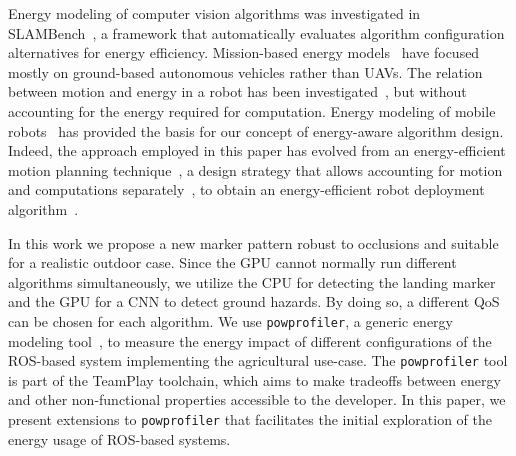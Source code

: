 \documentclass[conference]{IEEEtran}
\newcommand{\stt}[1]{{\small\tt #1}} %
\newcommand{\powprof}{\stt{powprofiler}}
\begin{document}
Energy modeling of computer vision algorithms was investigated in
SLAMBench~\cite{nardi2015introducing}, a framework that automatically evaluates
algorithm configuration alternatives
for energy efficiency. 
%
Mission-based energy
models~\cite{sadrpour2013experimental} have 
focused mostly on ground-based autonomous vehicles rather than UAVs. 
The relation between motion and energy in a
robot has been investigated~\cite{morales2009power}, but without accounting for the energy required for computation.
%
Energy modeling of mobile robots~\cite{mei2006deployment} has provided
the basis for our concept of %
energy-aware algorithm design. Indeed, the approach employed in this paper has evolved
from an energy-efficient motion planning technique~\cite{mei2004energy}, a design strategy that allows accounting for
motion and computations separately~\cite{mei2005case}, to obtain an
energy-efficient robot deployment algorithm~\cite{mei2006deployment}.
%
%

In this work we propose a new marker pattern robust to occlusions and suitable for a realistic outdoor case. Since the GPU cannot normally run different algorithms simultaneously, we utilize the CPU for detecting the landing marker and the GPU for a CNN to detect ground hazards. By doing so, a different QoS can be chosen for each algorithm. We use \powprof{}, a generic energy
modeling tool~\cite{seewald2019coarse}, %
to measure the energy impact of different configurations of the ROS-based system
implementing the agricultural use-case.
The \powprof{} tool is part of the TeamPlay toolchain, which aims to make tradeoffs between energy and other non-functional properties accessible to the developer. 
In this paper, we present
extensions to \powprof{} that facilitates the initial exploration of
the energy usage of ROS-based systems.
\end{document}
